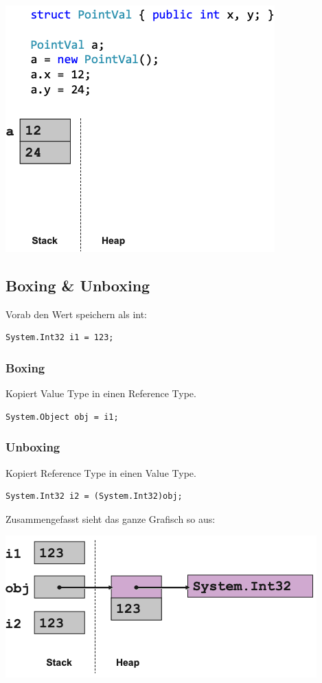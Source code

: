 \begin{center}
    \includegraphics[scale=0.35]{graphic/grundlagen/Grundlagen_Value Types.png}
\end{center}



\subsection{Boxing \& Unboxing}
Vorab den Wert speichern als int:
\begin{lstlisting}
System.Int32 i1 = 123;
\end{lstlisting}


\subsubsection{Boxing}
Kopiert Value Type in einen Reference Type.
\begin{lstlisting}
System.Object obj = i1;
\end{lstlisting}


\subsubsection{Unboxing}
Kopiert Reference Type in einen Value Type.
\begin{lstlisting}
System.Int32 i2 = (System.Int32)obj;
\end{lstlisting}

\vspace{10pt}

Zusammengefasst sieht das ganze Grafisch so aus:
\begin{center}
\includegraphics[scale=0.4]{graphic/grundlagen/Grundlagen_Boxing und Unboxing}
\end{center}


\newpage